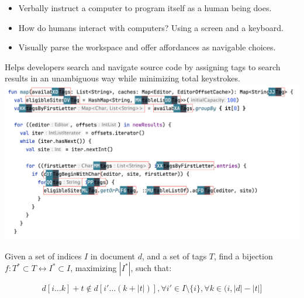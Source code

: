 \documentclass[portrait,a0b,final,a4resizeable]{a0poster}
\def\jointspacing{\vspace{0.3in}}
\begin{document}
\begin{poster}
\begin{multicols}{2}
        \null\hspace*{3cm}\begin{minipage}[c]{0.85\columnwidth}
        \begin{itemize}[labelsep=1em]
            \setlength\itemsep{0.5em}
            \item Verbally instruct a computer to program itself as a human being does.
            \item How do humans interact with computers? Using a screen and a keyboard.
            \item Visually parse the workspace and offer affordances as navigable choices.
        \end{itemize}
        \end{minipage}

        \jointspacing


        \null\hspace*{1.8cm}\begin{minipage}[c]{0.90\columnwidth}
            Helps developers search and navigate source code by assigning tags to search results in an unambiguous way while minimizing total keystrokes.\\
            \href{https://github.com/acejump/acejump}{\includegraphics[width=\textwidth]{acejump_screenshot.png}}


        Given a set of indices $I$ in document $d$, and a set of tags $T$, find a bijection $f: T^*\subset T \leftrightarrow I^*\subset I$, maximizing $|I^*|$, such that:

        \begin{equation*}
            d[i\ldots k] + t \notin d[i'\ldots(k + |t|)], \forall i' \in I\setminus\{i\}, \forall k \in (i, |d| - |t|]
        \end{equation*}


\end{minipage}
\end{multicols}
\end{poster}
\end{document}
